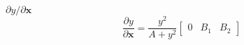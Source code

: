\vspace{-0.1in}
\begin{block}{$\partial y / \partial \mathbf{x}$}
\begin{equation*}
\frac{\partial y}{\partial \mathbf{x}} = \frac{y^2}{A + y^2} \begin{bmatrix} 0 & B_1 & B_2 \end{bmatrix}
\end{equation*}
\end{block}
